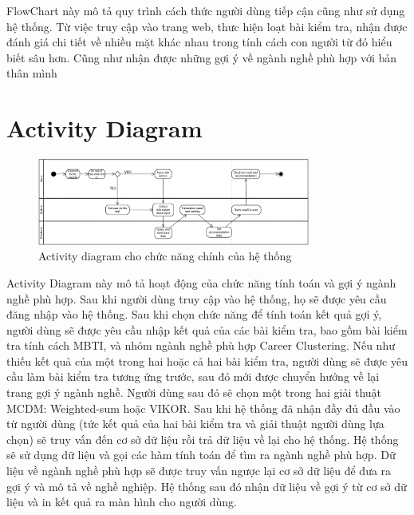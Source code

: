 FlowChart này mô tả quy trình cách thức người dùng tiếp cận cũng như sử dụng hệ thống.
Từ việc truy cập vào trang web, thưc hiện loạt bài kiểm tra, nhận được đánh giá chi tiết về nhiều mặt khác nhau
trong tính cách con người từ đó hiểu biết sâu hơn. Cũng như nhận được những gợi ý về ngành nghề phù hợp với bản thân mình

\section{Activity Diagram}

\begin{figure}[H]
    \centering
    \includegraphics[width=0.8\textwidth]{images/activityDiagram.png}
    \vspace{0.5cm}
    \caption{Activity diagram cho chức năng chính của hệ thống }
\end{figure}

Activity Diagram này mô tả hoạt động của chức năng tính toán và gợi ý ngành nghề phù hợp. Sau khi người dùng truy cập vào hệ thống, họ sẽ được yêu cầu đăng nhập vào hệ thống. Sau khi chọn chức năng để tính toán kết quả gợi ý, người dùng sẽ được yêu cầu nhập kết quả của các bài kiểm tra, bao gồm bài kiểm tra tính cách MBTI, và nhóm ngành nghề phù hợp Career Clustering. Nếu như thiếu kết quả của một trong hai hoặc cả hai bài kiểm tra, người dùng sẽ được yêu cầu làm bài kiểm tra tương ứng trước, sau đó mới được chuyển hướng về lại trang gợi ý ngành nghề. Người dùng sau đó sẽ chọn một trong hai giải thuật MCDM: Weighted-sum hoặc VIKOR. Sau khi hệ thống đã nhận đầy đủ đầu vào từ người dùng (tức kết quả của hai bài kiểm tra và giải thuật người dùng lựa chọn) sẽ truy vấn đến cơ sở dữ liệu rồi trả dữ liệu về lại cho hệ thống. Hệ thống sẽ sử dụng dữ liệu và gọi các hàm tính toán để tìm ra ngành nghề phù hợp. Dữ liệu về ngành nghề phù hợp sẽ được truy vấn ngược lại cơ sở dữ liệu để đưa ra gợi ý và mô tả về nghề nghiệp. Hệ thống sau đó nhận dữ liệu về gợi ý từ cơ sở dữ liệu và in kết quả ra màn hình cho người dùng.
